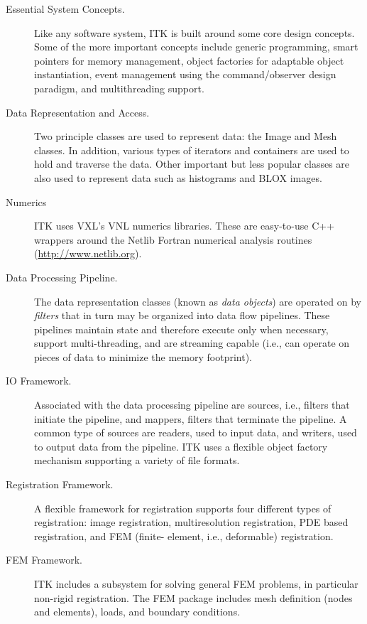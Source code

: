 \begin{description}
	\item[Essential System Concepts.] Like any software system, ITK is
        built around some core design concepts. Some of the more important
        concepts include generic programming, smart pointers for memory
        management, object factories for adaptable object instantiation,
        event management using the command/observer design paradigm, and
        multithreading support.

	\item[Data Representation and Access.]  Two principle classes are
        used to represent data: the Image and Mesh classes. In addition,
        various types of iterators and containers are used to hold and
        traverse the data. Other important but less popular classes are
        also used to represent data such as histograms and BLOX images.

	\item[Numerics] ITK uses VXL's VNL numerics libraries. These are
        easy-to-use C++ wrappers around the Netlib Fortran numerical 
        analysis routines (\url{http://www.netlib.org}).

	\item[Data Processing Pipeline.]  The data representation classes
        (known as \emph{data objects}) are operated on by \emph{filters} that
        in turn may be organized into data flow pipelines. These pipelines
        maintain state and therefore execute only when necessary, support
        multi-threading, and are streaming capable (i.e., can operate on
        pieces of data to minimize the memory footprint).

        \item[IO Framework.] Associated with the data processing pipeline are
        sources, i.e., filters that initiate the pipeline, and mappers,
        filters that terminate the pipeline. A common type of
        sources are readers, used to input data, and writers, used to
        output data from the pipeline. ITK uses a flexible object factory
        mechanism supporting a variety of file formats.

	\item[Registration Framework.] A flexible framework for registration
        supports four different types of registration: image registration,
        multiresolution registration, PDE based registration, and FEM (finite-
        element, i.e., deformable) registration.

	\item[FEM Framework.] ITK includes a subsystem for solving general
        FEM problems, in particular non-rigid registration. The FEM package
        includes mesh definition (nodes and elements), loads, and boundary
        conditions.


\end{description}
